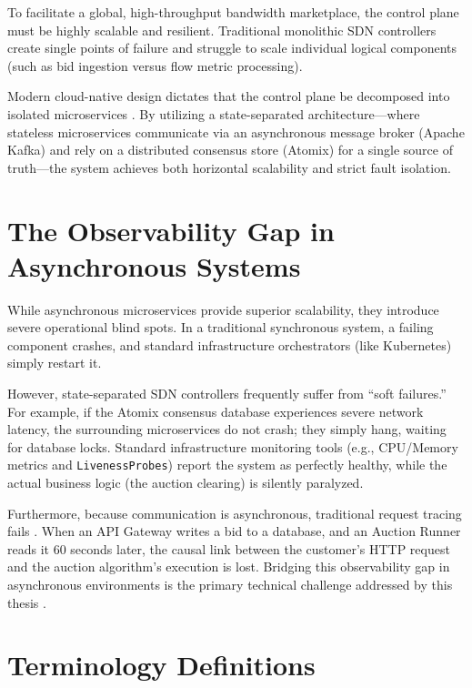 To facilitate a global, high-throughput bandwidth marketplace, the control plane must be highly scalable and resilient. Traditional monolithic SDN controllers \cite{mckeownOpenFlowEnablingInnovation2008} create single points of failure and struggle to scale individual logical components (such as bid ingestion versus flow metric processing). 

Modern cloud-native design dictates that the control plane be decomposed into isolated microservices \cite{newmanBuildingMicroservices2015}. By utilizing a state-separated architecture---where stateless microservices communicate via an asynchronous message broker (Apache Kafka) \cite{newtmannKafkaDistributedStreamingPlatform2016} and rely on a distributed consensus store (Atomix) \cite{ongaroRaftConsensusAlgorithm2014} for a single source of truth---the system achieves both horizontal scalability and strict fault isolation. 

\section{The Observability Gap in Asynchronous Systems}

While asynchronous microservices provide superior scalability, they introduce severe operational blind spots. In a traditional synchronous system, a failing component crashes, and standard infrastructure orchestrators (like Kubernetes) simply restart it. 

However, state-separated SDN controllers frequently suffer from ``soft failures.'' For example, if the Atomix consensus database experiences severe network latency, the surrounding microservices do not crash; they simply hang, waiting for database locks. Standard infrastructure monitoring tools \cite{fernandoContainerOrchestrationKubernetes2017} (e.g., CPU/Memory metrics and \texttt{LivenessProbes}) report the system as perfectly healthy, while the actual business logic (the auction clearing) is silently paralyzed.

Furthermore, because communication is asynchronous, traditional request tracing fails \cite{sigelman2010dapper}. When an API Gateway writes a bid to a database, and an Auction Runner reads it 60 seconds later, the causal link between the customer's HTTP request and the auction algorithm's execution is lost. Bridging this observability gap in asynchronous environments is the primary technical challenge addressed by this thesis \cite{majorsObservabilityEngineering2022}.

\section{Terminology Definitions}

